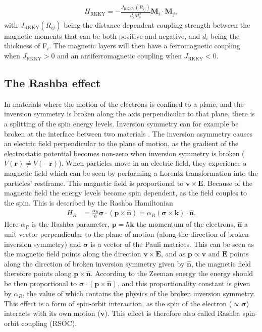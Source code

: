 \begin{align}
    H_{\text{RKKY}} = -\frac{J_{\text{RKKY}}(R_{ij})}{d_iM_s^2}\mathbold{M}_i\cdot\mathbold{M}_j,
\end{align}
with $J_{\text{RKKY}}(R_{ij})$ being the distance dependent coupling strength between the magnetic moments that can be both positive and negative, and $d_i$ being the thickness of F$_i$. The magnetic layers will then have a ferromagnetic coupling when $J_{\text{RKKY}}>0$ and an antiferromagnetic coupling when $J_{\text{RKKY}}<0$.

\subsection{The Rashba effect}
In materials where the motion of the electrons is confined to a plane, and the inversion symmetry is broken along the axis perpendicular to that plane, there is a splitting of the spin energy levels. Inversion symmetry can for example be broken at the interface between two materials \cite{Heide2006}. The inversion asymmetry causes an electric field perpendicular to the plane of motion, as the gradient of the electrostatic potential becomes non-zero when inversion symmetry is broken ($V(\mathbold{r}) \neq V(-\mathbold{r})$). When particles move in an electric field, they experience a magnetic field which can be seen by performing a Lorentz transformation into the particles' restframe. This magnetic field is proportional to $\mathbold{v}\times\mathbold{E}$. Because of the magnetic field the energy levels become spin dependent, as the field couples to the spin. This is described by the Rashba Hamiltonian \citep{BychovRashba1984}
\begin{align}
H_R &= \frac{\alpha_R}{\hbar}\mathbold{\sigma}\cdot(\mathbold{p}\times\mathbold{\hat{n}}) = \alpha_R (\mathbold{\sigma}\times\mathbold{k})\cdot\mathbold{\hat{n}}.
\label{eq:RashbaH}
\end{align}
Here $\alpha_R$ is the Rashba parameter, $\mathbold{p} = \hbar\mathbold{k}$ the momentum of the electrons, $\mathbold{\hat{n}}$ a unit vector perpendicular to the plane of motion (along the direction of broken inversion symmetry) and $\mathbold{\sigma}$ is a vector of the Pauli matrices. This can be seen as the magnetic field points along the direction $\mathbold{v}\times\mathbold{E}$, and as $\mathbold{p}\propto\mathbold{v}$ and $\mathbold{E}$ points along the direction of broken inversion symmetry given by $\mathbold{\hat{n}}$, the magnetic field therefore points along $\mathbold{p}\times\mathbold{\hat{n}}$. According to the Zeeman energy the energy should be then proportional to $\mathbold{\sigma}\cdot(\mathbold{p}\times\mathbold{\hat{n}})$, and this proportionality constant is given by $\alpha_R$, the value of which contains the physics of the broken inversion symmetry. This effect is a form of spin-orbit interaction, as the spin of the electron ($\propto \mathbold{\sigma}$) interacts with its own motion ($\mathbold{v}$). This effect is therefore also called Rashba spin-orbit coupling (RSOC).

